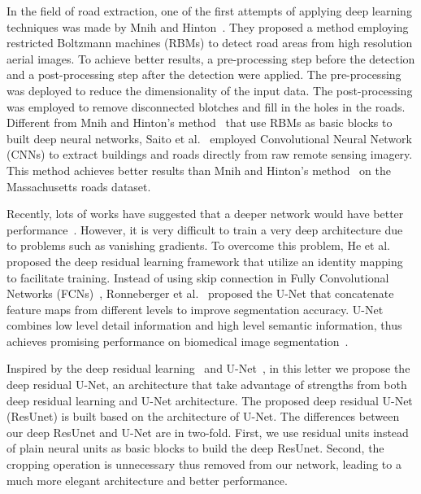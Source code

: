 \documentclass[journal]{IEEEtran}
\begin{document}
In the field of road extraction, one of the first attempts of applying deep learning techniques was made by Mnih and Hinton~\cite{mnih2010learning}. They proposed a method employing restricted Boltzmann machines (RBMs) to detect road areas from high resolution aerial images. To achieve better results, a pre-processing step before the detection and a post-processing step after the detection were applied. The pre-processing was deployed to reduce the dimensionality of the input data. The post-processing was employed to remove disconnected blotches and fill in the holes in the roads. Different from Mnih and Hinton's method~\cite{mnih2010learning} that use RBMs as basic blocks to built deep neural networks, Saito et al.~\cite{Saito2016Multiple} employed Convolutional Neural Network (CNNs) to extract buildings and roads directly from raw remote sensing imagery. This method achieves better results than Mnih and Hinton's method~\cite{mnih2010learning} on the Massachusetts roads dataset.

Recently, lots of works have suggested that a deeper network would have better performance~\cite{szegedy2015going,simonyan2014very}. However, it is very difficult to train a very deep architecture due to problems such as vanishing gradients. To overcome this problem, He et al.~\cite{resnet2015deep} proposed the deep residual learning framework that utilize an identity mapping~\cite{resnet2016} to facilitate  training. Instead of using skip connection in Fully Convolutional Networks (FCNs)~\cite{FCN2015fully}, Ronneberger et al.~\cite{U-NET2015} proposed the U-Net that concatenate  feature maps from different levels to improve segmentation accuracy. U-Net combines low level detail information and high level semantic information, thus achieves promising performance on biomedical image segmentation~\cite{U-NET2015}. 

Inspired by the deep residual learning~\cite{resnet2015deep} and U-Net~\cite{U-NET2015}, in this letter we propose the deep residual U-Net, an architecture that take advantage of strengths from both deep residual learning and U-Net architecture. The proposed deep residual U-Net (ResUnet) is built based on the architecture of U-Net. The differences between our deep ResUnet and U-Net are in two-fold. First, we use residual units instead of plain neural units as basic blocks to build the deep ResUnet. Second, the cropping operation is unnecessary thus removed from our network, leading to a much more elegant architecture and better performance. 
\end{document}
